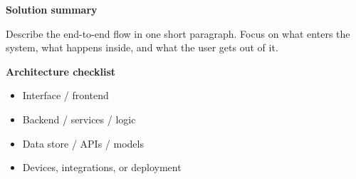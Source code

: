 

\begin{minipage}[t]{0.48\linewidth}
\textbf{Solution summary}

Describe the end-to-end flow in one short paragraph. Focus on what enters the system, what happens inside, and what the user gets out of it.
\end{minipage}
\hfill
\begin{minipage}[t]{0.48\linewidth}
\textbf{Architecture checklist}
\begin{itemize}
  \item Interface / frontend
  \item Backend / services / logic
  \item Data store / APIs / models
  \item Devices, integrations, or deployment
\end{itemize}
\end{minipage}

